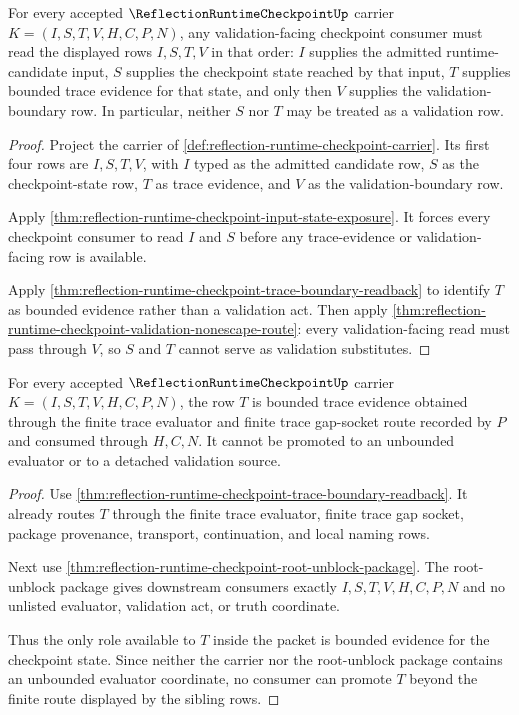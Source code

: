 \begin{theorem}
\label{thm:reflection-runtime-checkpoint-validation-row-precedence}
For every accepted $\ReflectionRuntimeCheckpointUp$ carrier $K=(I,S,T,V,H,C,P,N)$, any validation-facing checkpoint consumer must read the displayed rows $I,S,T,V$ in that order: $I$ supplies the admitted runtime-candidate input, $S$ supplies the checkpoint state reached by that input, $T$ supplies bounded trace evidence for that state, and only then $V$ supplies the validation-boundary row. In particular, neither $S$ nor $T$ may be treated as a validation row.
\end{theorem}
\begin{proof}
Project the carrier of \autoref{def:reflection-runtime-checkpoint-carrier}. Its first four rows are $I,S,T,V$, with $I$ typed as the admitted candidate row, $S$ as the checkpoint-state row, $T$ as trace evidence, and $V$ as the validation-boundary row.

Apply \autoref{thm:reflection-runtime-checkpoint-input-state-exposure}. It forces every checkpoint consumer to read $I$ and $S$ before any trace-evidence or validation-facing row is available.

Apply \autoref{thm:reflection-runtime-checkpoint-trace-boundary-readback} to identify $T$ as bounded evidence rather than a validation act. Then apply \autoref{thm:reflection-runtime-checkpoint-validation-nonescape-route}: every validation-facing read must pass through $V$, so $S$ and $T$ cannot serve as validation substitutes.
\end{proof}

\begin{theorem}
\label{thm:reflection-runtime-checkpoint-trace-evidence-finiteness}
For every accepted $\ReflectionRuntimeCheckpointUp$ carrier $K=(I,S,T,V,H,C,P,N)$, the row $T$ is bounded trace evidence obtained through the finite trace evaluator and finite trace gap-socket route recorded by $P$ and consumed through $H,C,N$. It cannot be promoted to an unbounded evaluator or to a detached validation source.
\end{theorem}
\begin{proof}
Use \autoref{thm:reflection-runtime-checkpoint-trace-boundary-readback}. It already routes $T$ through the finite trace evaluator, finite trace gap socket, package provenance, transport, continuation, and local naming rows.

Next use \autoref{thm:reflection-runtime-checkpoint-root-unblock-package}. The root-unblock package gives downstream consumers exactly $I,S,T,V,H,C,P,N$ and no unlisted evaluator, validation act, or truth coordinate.

Thus the only role available to $T$ inside the packet is bounded evidence for the checkpoint state. Since neither the carrier nor the root-unblock package contains an unbounded evaluator coordinate, no consumer can promote $T$ beyond the finite route displayed by the sibling rows.
\end{proof}


